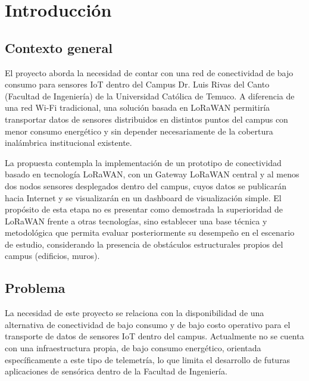 \documentclass[12pt,oneside,openany,spanish,oldfontcommands]{memoir}
\begin{document}
\chapter{Introducción}

\section{Contexto general}

El proyecto aborda la necesidad de contar con una red de conectividad de bajo consumo
para sensores IoT dentro del Campus Dr. Luis Rivas del Canto (Facultad de Ingeniería) de
la Universidad Católica de Temuco. A diferencia de una red Wi-Fi tradicional, una solución
basada en LoRaWAN permitiría transportar datos de sensores distribuidos en distintos
puntos del campus con menor consumo energético y sin depender necesariamente de la
cobertura inalámbrica institucional existente.

La propuesta contempla la implementación de un prototipo de conectividad basado en
tecnología LoRaWAN, con un Gateway LoRaWAN central y al menos dos nodos sensores desplegados
dentro del campus, cuyos datos se publicarán hacia Internet y se visualizarán en un
dashboard de visualización simple. El propósito de esta etapa no es presentar como
demostrada la superioridad de LoRaWAN frente a otras tecnologías, sino establecer una base
técnica y metodológica que permita evaluar posteriormente su desempeño en el escenario de
estudio, considerando la presencia de obstáculos estructurales propios del campus
(edificios, muros).

\section{Problema}

La necesidad de este proyecto se relaciona con la disponibilidad de una alternativa de
conectividad de bajo consumo y de bajo costo operativo para el transporte de datos de
sensores IoT dentro del campus. Actualmente no se cuenta con una infraestructura propia,
de bajo consumo energético, orientada específicamente a este tipo de telemetría, lo que
limita el desarrollo de futuras aplicaciones de sensórica dentro de la Facultad de
Ingeniería.
\end{document}
